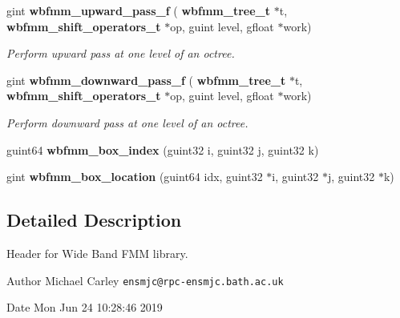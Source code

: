 \begin{DoxyCompactItemize}
gint \textbf{ wbfmm\+\_\+upward\+\_\+pass\+\_\+f} (\textbf{ wbfmm\+\_\+tree\+\_\+t} $\ast$t, \textbf{ wbfmm\+\_\+shift\+\_\+operators\+\_\+t} $\ast$op, guint level, gfloat $\ast$work)
\begin{DoxyCompactList}\small\item\em Perform upward pass at one level of an octree. \end{DoxyCompactList}\item 
gint \textbf{ wbfmm\+\_\+downward\+\_\+pass\+\_\+f} (\textbf{ wbfmm\+\_\+tree\+\_\+t} $\ast$t, \textbf{ wbfmm\+\_\+shift\+\_\+operators\+\_\+t} $\ast$op, guint level, gfloat $\ast$work)
\begin{DoxyCompactList}\small\item\em Perform downward pass at one level of an octree. \end{DoxyCompactList}\item 
guint64 \textbf{ wbfmm\+\_\+box\+\_\+index} (guint32 i, guint32 j, guint32 k)
\item 
gint \textbf{ wbfmm\+\_\+box\+\_\+location} (guint64 idx, guint32 $\ast$i, guint32 $\ast$j, guint32 $\ast$k)
\end{DoxyCompactItemize}


\subsection{Detailed Description}
Header for Wide Band F\+MM library. 

\begin{DoxyAuthor}{Author}
Michael Carley {\tt ensmjc@rpc-\/ensmjc.\+bath.\+ac.\+uk} 
\end{DoxyAuthor}
\begin{DoxyDate}{Date}
Mon Jun 24 10\+:28\+:46 2019 
\end{DoxyDate}
